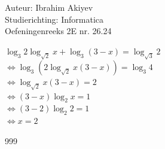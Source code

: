 \documentclass[a4paper]{article}
\begin{document}
\noindent \large Auteur: Ibrahim Akiyev \\
\noindent \large Studierichting: Informatica\\
\noindent \large Oefeningenreeks 2E nr. 26.24\\

\medskip

\normalsize

$\log_{3}2\log_{\sqrt{2}} x + \log_{3}(3-x) = \log_{\sqrt{3}}2$\\

$\Leftrightarrow \log_{3}(2\log_{\sqrt{2}} x (3-x)) = \log_{3}4$\\

$\Leftrightarrow \log_{\sqrt{2}}x(3-x) = 2$ \\

$\Leftrightarrow (3-x) \log_{2} x=1$\\

$\Leftrightarrow (3-2)\log_{2}2 = 1$\\

$ \Leftrightarrow x = 2$\\

\begin{thebibliography}{999}
\end{thebibliography}
\end{document}
